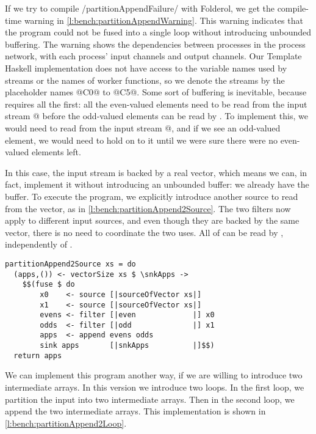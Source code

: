 If we try to compile \Hs/partitionAppendFailure/ with Folderol, we get the compile-time warning in \cref{l:bench:partitionAppendWarning}.
This warning indicates that the program could not be fused into a single loop without introducing unbounded buffering.
The warning shows the dependencies between processes in the process network, with each process' input channels and output channels.
Our Template Haskell implementation does not have access to the variable names used by streams or the names of worker functions, so we denote the streams by the placeholder names @C0@ to @C5@.
Some sort of buffering is inevitable, because \Hs@append@ requires all the \Hs@evens@ first: all the even-valued elements need to be read from the input stream @ before the odd-valued elements can be read by \Hs@append@.
To implement this, we would need to read from the input stream @, and if we see an odd-valued element, we would need to hold on to it until we were sure there were no even-valued elements left.


In this case, the input stream is backed by a real vector, which means we can, in fact, implement it without introducing an unbounded buffer: we already have the buffer.
To execute the program, we explicitly introduce another source to read from the vector, as in \cref{l:bench:partitionAppend2Source}.
The two filters now apply to different input sources, and even though they are backed by the same vector, there is no need to coordinate the two uses.
All of \Hs@evens@ can be read by \Hs@append@, independently of \Hs@odds@.

\begin{lstlisting}[float,label=l:bench:partitionAppend2Source,caption=Partition / append with two sources]
partitionAppend2Source xs = do
  (apps,()) <- vectorSize xs $ \snkApps ->
    $$(fuse $ do
        x0    <- source [|sourceOfVector xs|]
        x1    <- source [|sourceOfVector xs|]
        evens <- filter [|even             |] x0
        odds  <- filter [|odd              |] x1
        apps  <- append evens odds
        sink apps       [|snkApps          |]$$)
  return apps
\end{lstlisting}

We can implement this program another way, if we are willing to introduce two intermediate arrays.
In this version we introduce two loops.
In the first loop, we partition the input into two intermediate arrays.
Then in the second loop, we append the two intermediate arrays.
This implementation is shown in \cref{l:bench:partitionAppend2Loop}.

